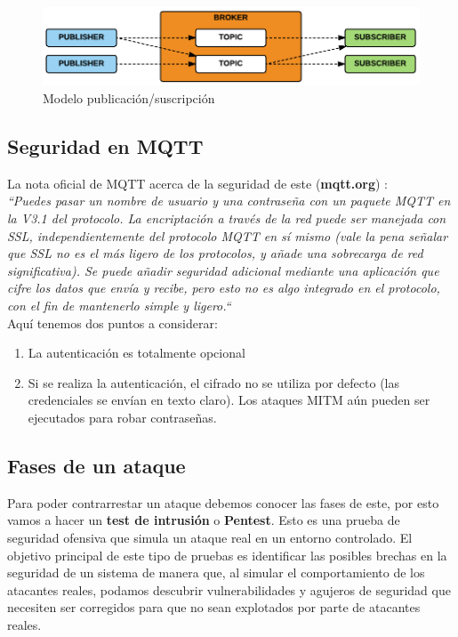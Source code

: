 {\begin{figure}[hb!]
    \centering
    \includegraphics[width=\linewidth]{imagenes/sub-pattern-mqtt.png}
    \caption{Modelo publicación/suscripción \cite{disenio-mqtt}}
    \label{fig:figure13-mqtt-design}
\end{figure}

\subsection{Seguridad en MQTT}

La nota oficial de MQTT acerca de la seguridad de este (\textbf{mqtt.org}) \cite{mqtt}: \\

\textit{``Puedes pasar un nombre de usuario y una contraseña con un paquete MQTT en la V3.1 del protocolo. La encriptación a través de la red puede ser manejada con SSL, independientemente del protocolo MQTT en sí mismo (vale la pena señalar que SSL no es el más ligero de los protocolos, y añade una sobrecarga de red significativa). Se puede añadir seguridad adicional mediante una aplicación que cifre los datos que envía y recibe, pero esto no es algo integrado en el protocolo, con el fin de mantenerlo simple y ligero.``}\\

Aquí tenemos dos puntos a considerar:

\begin{enumerate}
    \item La autenticación es totalmente opcional
    \item Si se realiza la autenticación, el cifrado no se utiliza por defecto (las credenciales se envían en texto claro). Los ataques MITM aún pueden ser ejecutados para robar contraseñas.
\end{enumerate}

\subsection{Fases de un ataque}

Para poder contrarrestar un ataque debemos conocer las fases de este, por esto vamos a hacer un \textbf{test de intrusión} o \textbf{Pentest}. Esto es una prueba de seguridad ofensiva que simula un ataque real en un entorno controlado. El objetivo principal de este tipo de pruebas es identificar las posibles brechas en la seguridad de un sistema de manera que, al simular el comportamiento de los atacantes reales, podamos descubrir vulnerabilidades y agujeros de seguridad que necesiten ser corregidos para que no sean explotados por parte de atacantes reales. \cite{pentesting} \\

}
